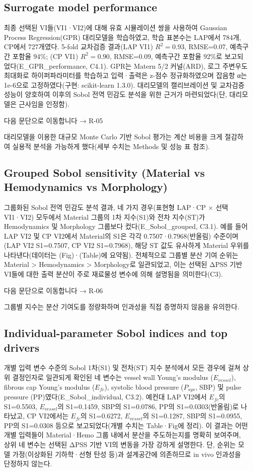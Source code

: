 \documentclass[preprint,12pt]{elsarticle}
\begin{document}
\subsection{Surrogate model performance}
최종 선택된 VI들(VI1·VI2)에 대해 유효 시뮬레이션 쌍을 사용하여 Gaussian Process Regression(GPR) 대리모델을 학습하였고, 학습 표본수는 LAP에서 784개, CP에서 727개였다. 5-fold 교차검증 결과(LAP VI1) $R^2=0.93$, RMSE=0.07, 예측구간 포함율 94\%; (CP VI1) $R^2=0.90$, RMSE=0.09, 예측구간 포함율 92\%로 보고되었다(E\_GPR\_performance, C4.1). GPR는 Matern 5/2 커널(ARD), 로그 주변우도 최대화로 하이퍼파라미터를 학습하고 입력·출력은 z-점수 정규화하였으며 잡음항 α는 1e-6으로 고정하였다(구현: scikit-learn 1.3.0). 대리모델의 캘리브레이션 및 교차검증 성능이 양호하여 이후의 Sobol 전역 민감도 분석을 위한 근거가 마련되었다(단, 대리모델은 근사임을 인정함).

다음 문단으로 이동합니다 → R-05

대리모델을 이용한 대규모 Monte Carlo 기반 Sobol 평가는 계산 비용을 크게 절감하여 실용적 분석을 가능하게 했다(세부 수치는 Methods 및 성능 표 참조).

\subsection{Grouped Sobol sensitivity (Material vs Hemodynamics vs Morphology)}
그룹화된 Sobol 전역 민감도 분석 결과, 네 가지 경우(표현형 LAP·CP × 선택 VI1·VI2) 모두에서 Material 그룹의 1차 지수(S1)와 전차 지수(ST)가 Hemodynamics 및 Morphology 그룹보다 컸다(E\_Sobol\_grouped, C3.1). 예를 들어 LAP VI2 및 CP VI2에서 Material의 S1은 각각 0.7507·0.7968(반올림) 수준이며(LAP VI2 S1=0.7507, CP VI2 S1=0.7968), 해당 ST 값도 유사하게 Material 우위를 나타낸다(데이터는 (Fig)·(Table)에 요약됨). 전체적으로 그룹별 분산 기여 순위는 Material > Hemodynamics > Morphology로 일관되었고, 이는 선택된 ΔPSS 기반 VI들에 대한 출력 분산이 주로 재료물성 변수에 의해 설명됨을 의미한다(C3).

다음 문단으로 이동합니다 → R-06

그룹별 지수는 분산 기여도를 정량화하며 인과성을 직접 증명하지 않음을 유의한다.

\subsection{Individual-parameter Sobol indices and top drivers}
개별 입력 변수 수준의 Sobol 1차(S1) 및 전차(ST) 지수 분석에서 모든 경우에 걸쳐 상위 결정인자로 일관되게 확인된 네 변수는 vessel wall Young's modulus ($E_{vessel}$), fibrous cap Young's modulus ($E_{fc}$), systolic blood pressure ($P_{sys}$, SBP) 및 pulse pressure (PP)였다(E\_Sobol\_individual, C3.2). 예컨대 LAP VI2에서 $E_{fc}$의 S1=0.5503, $E_{vessel}$의 S1=0.1459, SBP의 S1=0.0786, PP의 S1=0.0303(반올림)로 나타났고, CP VI2에서는 $E_{fc}$의 S1=0.6272, $E_{vessel}$의 S1=0.1287, SBP의 S1=0.0955, PP의 S1=0.0308 등으로 보고되었다(개별 수치는 Table·Fig에 정리). 이 결과는 어떤 개별 입력들이 Material·Hemo 그룹 내에서 분산을 주도하는지를 명확히 보여주며, 상위 네 변수는 선택된 ΔPSS 기반 VI의 변동을 가장 강하게 설명한다. 단, 순위는 모델 가정(이상화된 기하학·선형 탄성 등)과 설계공간에 의존하므로 in vivo 인과성을 단정하지 않는다.
\end{document}
